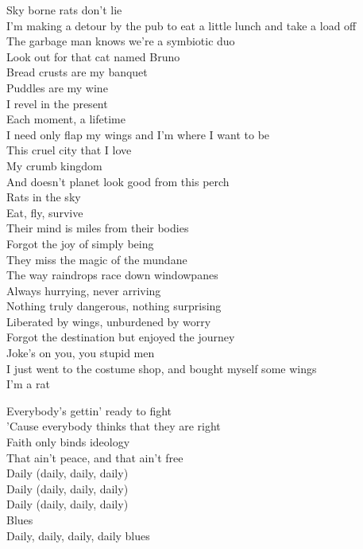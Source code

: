 Sky borne rats don't lie\\
I'm making a detour by the pub to eat a little lunch and take a load off\\
The garbage man knows we're a symbiotic duo\\
Look out for that cat named Bruno\\

Bread crusts are my banquet\\
Puddles are my wine\\
I revel in the present\\
Each moment, a lifetime\\
I need only flap my wings and I'm where I want to be\\
This cruel city that I love\\
My crumb kingdom\\
And doesn't planet  look good from this perch\\
Rats in the sky\\
Eat, fly, survive\\

Their mind is miles from their bodies\\
Forgot the joy of simply being\\
They miss the magic of the mundane\\
The way raindrops race down windowpanes\\
Always hurrying, never arriving\\
Nothing truly dangerous, nothing surprising\\
Liberated by wings, unburdened by worry\\
Forgot the destination but enjoyed the journey\\

Joke's on you, you stupid men\\
I just went to the costume shop, and bought myself some wings\\
I'm a rat\\



Everybody's gettin' ready to fight\\
'Cause everybody thinks that they are right\\
Faith only binds ideology\\
That ain't peace, and that ain't free\\
Daily (daily, daily, daily)\\
Daily (daily, daily, daily)\\
Daily (daily, daily, daily)\\
Blues\\
Daily, daily, daily, daily blues\\

